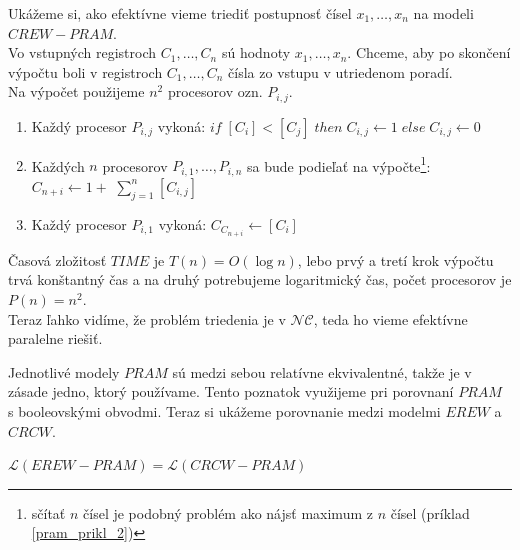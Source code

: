 \begin{priklad}
  Ukážeme si, ako efektívne vieme triediť postupnosť čísel
  $x_1,\dots ,x_n$ na modeli $CREW-PRAM$.
  \\ Vo vstupných registroch $C_1,\dots ,C_n$ sú hodnoty $x_1,\dots
  ,x_n$. Chceme, aby po skončení výpočtu boli v registroch
  $C_1,\dots ,C_n$ čísla zo vstupu v utriedenom poradí.
  \\ Na výpočet použijeme $n^2$ procesorov ozn. $P_{i,j}$.
  \begin{enumerate}
    \item Každý procesor $P_{i,j}$ vykoná: $if\; [C_i]<[C_j]\; then\;
    C_{i,j}\leftarrow 1\; else\; C_{i,j}\leftarrow 0$
    \item Každých $n$ procesorov $P_{i,1},\dots ,P_{i,n}$ sa bude
    podieľať na výpočte\footnote{sčítať $n$ čísel je podobný problém
    ako nájsť maximum z $n$ čísel (príklad \ref{pram_prikl_2})}:
    $C_{n+i}\leftarrow 1+$ $\sum\limits_{j=1}^{n} [C_{i,j}]$
    \item Každý procesor $P_{i,1}$ vykoná: $C_{C_{n+i}}\leftarrow [C_i]$
  \end{enumerate}
  Časová zložitosť $TIME$ je $T(n)=O(\log n)$, lebo prvý a tretí
  krok výpočtu trvá konštantný čas a na druhý potrebujeme
  logaritmický čas, počet procesorov je $P(n)=n^2$.
  \\ Teraz ľahko vidíme, že problém triedenia je v $\mathcal{NC}$,
  teda ho vieme efektívne paralelne riešiť.
\end{priklad}

\medskip
Jednotlivé modely $PRAM$ sú medzi sebou relatívne ekvivalentné,
takže je v zásade jedno, ktorý používame. Tento poznatok využijeme
pri porovnaní $PRAM$ s booleovskými obvodmi. Teraz si ukážeme
porovnanie medzi modelmi $EREW$ a $CRCW$.

\begin{veta}
  $\mathcal{L}(EREW-PRAM)=\mathcal{L}(CRCW-PRAM)$
\end{veta}


